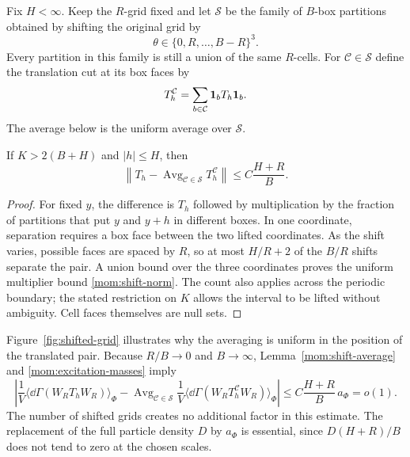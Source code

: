 Fix $H<\infty$. Keep the $R$-grid fixed and let $\mathcal S$ be the
family of $B$-box partitions obtained by shifting the original grid by
\[
 \theta\in\{0,R,\ldots,B-R\}^3.
\]
Every partition in this family is still a union of the same $R$-cells.
For $\mathcal C\in\mathcal S$ define the translation cut at its box faces by
\begin{equation}\label{mom:cut-translation}
 T_h^{\mathcal C}=\sum_{b\in\mathcal C}\mathbf 1_bT_h\mathbf 1_b.
\end{equation}
The average below is the uniform average over $\mathcal S$.

\begin{lemma}\label{mom:shift-average}
If $K>2(B+H)$ and $|h|\le H$, then
\begin{equation}\label{mom:shift-norm}
 \left\|T_h-\operatorname{Avg}_{\mathcal C\in\mathcal S}
                        T_h^{\mathcal C}\right\|
          \le C\frac{H+R}{B}.
\end{equation}
\end{lemma}

\begin{proof}
For fixed $y$, the difference is $T_h$ followed by multiplication by
the fraction of partitions that put $y$ and $y+h$ in different boxes.
In one coordinate, separation requires a box face between the two
lifted coordinates. As the shift varies, possible faces are spaced by
$R$, so at most $H/R+2$ of the $B/R$ shifts separate the pair.
A union bound over the three coordinates proves the uniform multiplier
bound \eqref{mom:shift-norm}. The count also applies across the periodic
boundary; the stated restriction on $K$ allows the interval to be
lifted without ambiguity. Cell faces themselves are null sets.
\end{proof}

Figure~\ref{fig:shifted-grid} illustrates why the averaging is uniform in
the position of the translated pair. Because $R/B\to0$ and $B\to\infty$,
Lemma~\ref{mom:shift-average} and \eqref{mom:excitation-masses} imply
\begin{equation}\label{mom:boundary-cost}
 \left|\frac1V\langle\dd\Gamma(W_RT_hW_R)\rangle_\Phi
  -\operatorname{Avg}_{\mathcal C\in\mathcal S}
      \frac1V\langle\dd\Gamma(W_RT_h^{\mathcal C}W_R)\rangle_\Phi\right|
       \le C\frac{H+R}{B}\,a_\Phi=o(1).
\end{equation}
The number of shifted grids creates no additional factor in this estimate.
The replacement of the full particle density $D$ by $a_\Phi$ is
essential, since $D(H+R)/B$ does not tend to zero at the chosen scales.

